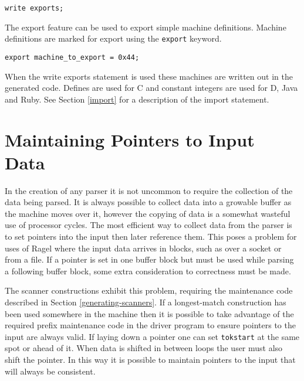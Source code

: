 \documentclass[letterpaper,11pt,oneside]{book}
\newcommand{\verbspace}{\vspace{10pt}}
\begin{document}
\begin{verbatim}
write exports;
\end{verbatim}
\verbspace

The export feature can be used to export simple machine definitions. Machine definitions
are marked for export using the \verb|export| keyword.

\verbspace
\begin{verbatim}
export machine_to_export = 0x44;
\end{verbatim}
\verbspace

When the write exports statement is used these machines are 
written out in the generated code. Defines are used for C and constant integers
are used for D, Java and Ruby. See Section \ref{import} for a description of the
import statement.
  
\section{Maintaining Pointers to Input Data}

In the creation of any parser it is not uncommon to require the collection of
the data being parsed.  It is always possible to collect data into a growable
buffer as the machine moves over it, however the copying of data is a somewhat
wasteful use of processor cycles. The most efficient way to collect data from
the parser is to set pointers into the input then later reference them.  This
poses a problem for uses of Ragel where the input data arrives in blocks, such
as over a socket or from a file. If a pointer is set in one buffer block but
must be used while parsing a following buffer block, some extra consideration
to correctness must be made.

The scanner constructions exhibit this problem, requiring the maintenance
code described in Section \ref{generating-scanners}. If a longest-match
construction has been used somewhere in the machine then it is possible to
take advantage of the required prefix maintenance code in the driver program to
ensure pointers to the input are always valid. If laying down a pointer one can
set \verb|tokstart| at the same spot or ahead of it. When data is shifted in
between loops the user must also shift the pointer.  In this way it is possible
to maintain pointers to the input that will always be consistent.
\end{document}
